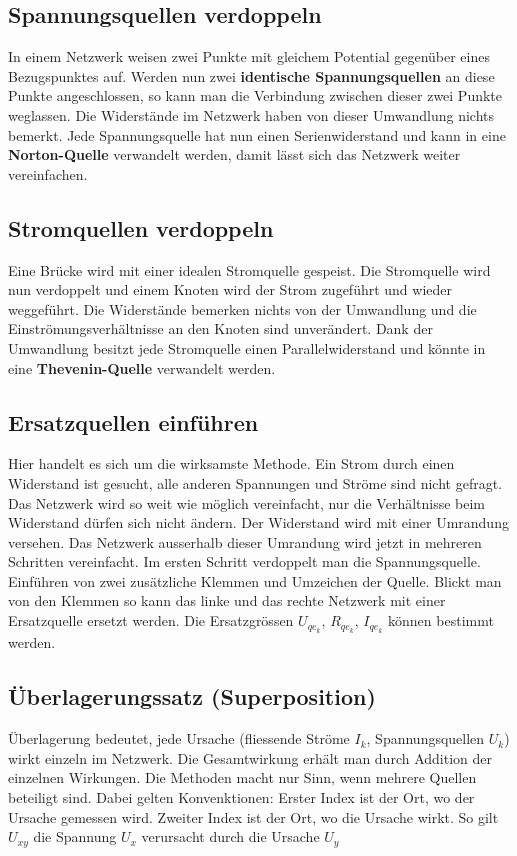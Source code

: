 \subsection{Spannungsquellen verdoppeln}
In einem Netzwerk weisen zwei Punkte mit gleichem Potential gegenüber eines Bezugspunktes auf. Werden nun zwei \textbf{identische Spannungsquellen} an diese Punkte angeschlossen, so kann man die Verbindung zwischen dieser zwei Punkte weglassen. Die Widerstände im Netzwerk haben von dieser Umwandlung nichts bemerkt.
\newline\newline
Jede Spannungsquelle hat nun einen Serienwiderstand und kann in eine \textbf{Norton-Quelle} verwandelt werden, damit lässt sich das Netzwerk weiter vereinfachen.
\subsection{Stromquellen verdoppeln}
Eine Brücke wird mit einer idealen Stromquelle gespeist. Die Stromquelle wird nun verdoppelt und einem Knoten wird der Strom zugeführt und wieder weggeführt. Die Widerstände bemerken nichts von der Umwandlung und die Einströmungsverhältnisse an den Knoten sind unverändert.
\newline\newline
Dank der Umwandlung besitzt jede Stromquelle einen Parallelwiderstand und könnte in eine \textbf{Thevenin-Quelle} verwandelt werden.
\subsection{Ersatzquellen einführen}
Hier handelt es sich um die wirksamste Methode. Ein Strom durch einen Widerstand ist gesucht, alle anderen Spannungen und Ströme sind nicht gefragt. Das Netzwerk wird so weit wie möglich vereinfacht, nur die Verhältnisse beim Widerstand dürfen sich nicht ändern. Der Widerstand wird mit einer Umrandung versehen. Das Netzwerk ausserhalb dieser Umrandung wird jetzt in mehreren Schritten vereinfacht. Im ersten Schritt verdoppelt man die Spannungsquelle.
\newline\newline
Einführen von zwei zusätzliche Klemmen und Umzeichen der Quelle. Blickt man von den Klemmen so kann das linke und das rechte Netzwerk mit einer Ersatzquelle ersetzt werden. Die Ersatzgrössen $U_{{qe}_k}$, $R_{{qe}_k}$, $I_{{qe}_k}$ können bestimmt werden.
\subsection{Überlagerungssatz (Superposition)}
Überlagerung bedeutet, jede Ursache (fliessende Ströme $I_k$, Spannungsquellen $U_k$) wirkt einzeln im Netzwerk. Die Gesamtwirkung erhält man durch Addition der einzelnen Wirkungen. Die Methoden macht nur Sinn, wenn mehrere Quellen beteiligt sind.
\newline\newline
Dabei gelten Konvenktionen: Erster Index ist der Ort, wo der Ursache gemessen wird. Zweiter Index ist der Ort, wo die Ursache wirkt. So gilt $U_{xy}$ die Spannung $U_x$ verursacht durch die Ursache $U_y$
